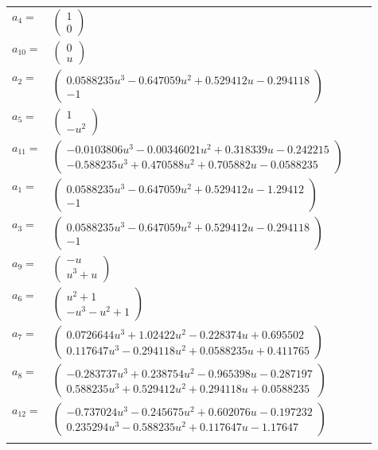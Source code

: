\documentclass[1p]{elsarticle_modified}
\theoremstyle{definition}
\begin{document}
\begin{tabular}{m{7pt} m{180pt} m{7pt} m{180pt} }
\flushright $a_{4}=$&$\begin{pmatrix}1\\0\end{pmatrix}$ \\
\flushright $a_{10}=$&$\begin{pmatrix}0\\u\end{pmatrix}$ \\
\flushright $a_{2}=$&$\begin{pmatrix}0.0588235 u^{3}-0.647059 u^{2}+0.529412 u-0.294118\\-1\end{pmatrix}$ \\
\flushright $a_{5}=$&$\begin{pmatrix}1\\- u^2\end{pmatrix}$ \\
\flushright $a_{11}=$&$\begin{pmatrix}-0.0103806 u^{3}-0.00346021 u^{2}+0.318339 u-0.242215\\-0.588235 u^{3}+0.470588 u^{2}+0.705882 u-0.0588235\end{pmatrix}$ \\
\flushright $a_{1}=$&$\begin{pmatrix}0.0588235 u^{3}-0.647059 u^{2}+0.529412 u-1.29412\\-1\end{pmatrix}$ \\
\flushright $a_{3}=$&$\begin{pmatrix}0.0588235 u^{3}-0.647059 u^{2}+0.529412 u-0.294118\\-1\end{pmatrix}$ \\
\flushright $a_{9}=$&$\begin{pmatrix}- u\\u^3+u\end{pmatrix}$ \\
\flushright $a_{6}=$&$\begin{pmatrix}u^2+1\\- u^3- u^2+1\end{pmatrix}$ \\
\flushright $a_{7}=$&$\begin{pmatrix}0.0726644 u^{3}+1.02422 u^{2}-0.228374 u+0.695502\\0.117647 u^{3}-0.294118 u^{2}+0.0588235 u+0.411765\end{pmatrix}$ \\
\flushright $a_{8}=$&$\begin{pmatrix}-0.283737 u^{3}+0.238754 u^{2}-0.965398 u-0.287197\\0.588235 u^{3}+0.529412 u^{2}+0.294118 u+0.0588235\end{pmatrix}$ \\
\flushright $a_{12}=$&$\begin{pmatrix}-0.737024 u^{3}-0.245675 u^{2}+0.602076 u-0.197232\\0.235294 u^{3}-0.588235 u^{2}+0.117647 u-1.17647\end{pmatrix}$\\&\end{tabular}
\end{document}
